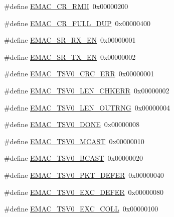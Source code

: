 \begin{DoxyCompactItemize}
\item 
\#define \hyperlink{group___e_m_a_c___private___macros_gaa385434bf367fbb86480da4682b49152}{\-E\-M\-A\-C\-\_\-\-C\-R\-\_\-\-R\-M\-I\-I}~0x00000200
\item 
\#define \hyperlink{group___e_m_a_c___private___macros_ga0528e680094183adb8c7b4fe6a06c4cb}{\-E\-M\-A\-C\-\_\-\-C\-R\-\_\-\-F\-U\-L\-L\-\_\-\-D\-U\-P}~0x00000400
\item 
\#define \hyperlink{group___e_m_a_c___private___macros_gab4275bfc0ec07740bd4aa0c10fdad19f}{\-E\-M\-A\-C\-\_\-\-S\-R\-\_\-\-R\-X\-\_\-\-E\-N}~0x00000001
\item 
\#define \hyperlink{group___e_m_a_c___private___macros_gaaec082d0578dc9f3513a63123cc8318b}{\-E\-M\-A\-C\-\_\-\-S\-R\-\_\-\-T\-X\-\_\-\-E\-N}~0x00000002
\item 
\#define \hyperlink{group___e_m_a_c___private___macros_gadc0b52603d6579ff03d1ae43bc756647}{\-E\-M\-A\-C\-\_\-\-T\-S\-V0\-\_\-\-C\-R\-C\-\_\-\-E\-R\-R}~0x00000001
\item 
\#define \hyperlink{group___e_m_a_c___private___macros_ga3334d8d2f8771051f347d6f7775c8a4e}{\-E\-M\-A\-C\-\_\-\-T\-S\-V0\-\_\-\-L\-E\-N\-\_\-\-C\-H\-K\-E\-R\-R}~0x00000002
\item 
\#define \hyperlink{group___e_m_a_c___private___macros_ga02ace1eb7a8521320a2b6314275da5f3}{\-E\-M\-A\-C\-\_\-\-T\-S\-V0\-\_\-\-L\-E\-N\-\_\-\-O\-U\-T\-R\-N\-G}~0x00000004
\item 
\#define \hyperlink{group___e_m_a_c___private___macros_ga7974d1db61c79295cf2d4ac6b07edf42}{\-E\-M\-A\-C\-\_\-\-T\-S\-V0\-\_\-\-D\-O\-N\-E}~0x00000008
\item 
\#define \hyperlink{group___e_m_a_c___private___macros_ga3a844a4a8166ce8c92c9b9a4e17622c9}{\-E\-M\-A\-C\-\_\-\-T\-S\-V0\-\_\-\-M\-C\-A\-S\-T}~0x00000010
\item 
\#define \hyperlink{group___e_m_a_c___private___macros_gac6f1862f758ed599b99c87779e2c3d25}{\-E\-M\-A\-C\-\_\-\-T\-S\-V0\-\_\-\-B\-C\-A\-S\-T}~0x00000020
\item 
\#define \hyperlink{group___e_m_a_c___private___macros_ga0e846de2fca06fa4f20a6aeebf6f9f77}{\-E\-M\-A\-C\-\_\-\-T\-S\-V0\-\_\-\-P\-K\-T\-\_\-\-D\-E\-F\-E\-R}~0x00000040
\item 
\#define \hyperlink{group___e_m_a_c___private___macros_gaa64b6e192395e2da9bdd0a3e874b62a8}{\-E\-M\-A\-C\-\_\-\-T\-S\-V0\-\_\-\-E\-X\-C\-\_\-\-D\-E\-F\-E\-R}~0x00000080
\item 
\#define \hyperlink{group___e_m_a_c___private___macros_ga90e1c69c075fd52e12457fd4452b7787}{\-E\-M\-A\-C\-\_\-\-T\-S\-V0\-\_\-\-E\-X\-C\-\_\-\-C\-O\-L\-L}~0x00000100

\end{DoxyCompactItemize}
